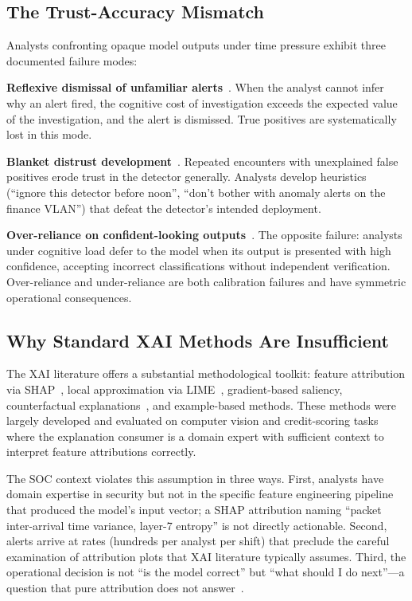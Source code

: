 \documentclass[sigconf,nonacm]{acmart}
\begin{document}
\subsection{The Trust-Accuracy Mismatch}

Analysts confronting opaque model outputs under time pressure exhibit three
documented failure modes:

\textbf{Reflexive dismissal of unfamiliar alerts}~\cite{kuppa2023}. When the
analyst cannot infer why an alert fired, the cognitive cost of investigation
exceeds the expected value of the investigation, and the alert is dismissed.
True positives are systematically lost in this mode.

\textbf{Blanket distrust development}~\cite{rosenberg2024soc}. Repeated
encounters with unexplained false positives erode trust in the detector
generally. Analysts develop heuristics (``ignore this detector before noon'',
``don't bother with anomaly alerts on the finance VLAN'') that defeat the
detector's intended deployment.

\textbf{Over-reliance on confident-looking outputs}~\cite{schemmer2023ai}.
The opposite failure: analysts under cognitive load defer to the model when
its output is presented with high confidence, accepting incorrect
classifications without independent verification. Over-reliance and
under-reliance are both calibration failures and have symmetric operational
consequences.

\subsection{Why Standard XAI Methods Are Insufficient}

The XAI literature offers a substantial methodological toolkit: feature
attribution via SHAP~\cite{lundberg2017shap},
local approximation via LIME~\cite{ribeiro2016lime}, gradient-based saliency,
counterfactual explanations~\cite{wachter2017counterfactual}, and example-based
methods. These methods were largely developed and evaluated on computer
vision and credit-scoring tasks where the explanation consumer is a domain
expert with sufficient context to interpret feature attributions correctly.

The SOC context violates this assumption in three ways. First, analysts have
domain expertise in security but not in the specific feature engineering
pipeline that produced the model's input vector; a SHAP attribution naming
``packet inter-arrival time variance, layer-7 entropy'' is not directly
actionable. Second, alerts arrive at rates (hundreds per analyst per shift)
that preclude the careful examination of attribution plots that XAI literature
typically assumes. Third, the operational decision is not ``is the model
correct'' but ``what should I do next''---a question that pure attribution
does not answer~\cite{nadeem2023sok}.
\end{document}
